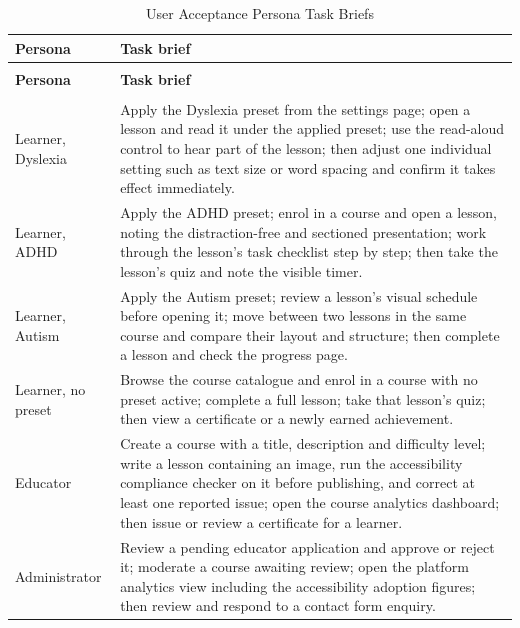 \documentclass[12pt, oneside]{article} %
\newcommand{\tabbreak}{\hyphenpenalty=200\exhyphenpenalty=200\tolerance=4000\hbadness=10000\hspace{0pt}}
\begin{document}
{
\renewcommand{\arraystretch}{1.2}
\footnotesize
\begin{longtable}{|>{\raggedright\arraybackslash\tabbreak}p{3.0cm}|>{\raggedright\arraybackslash\tabbreak}p{11.0cm}|}
\caption{User Acceptance Persona Task Briefs}
\label{tab:uat_personas}\\
\hline
\textbf{Persona} & \textbf{Task brief} \\
\hline \hline
\endfirsthead
\multicolumn{2}{l}{\footnotesize\itshape Table~\ref{tab:uat_personas} continued from the previous page}\\
\hline
\textbf{Persona} & \textbf{Task brief} \\
\hline \hline
\endhead
\hline
\multicolumn{2}{r}{\footnotesize\itshape continued on the next page}\\
\endfoot
\endlastfoot
Learner, Dyslexia & Apply the Dyslexia preset from the settings page; open a lesson and read it under the applied preset; use the read-aloud control to hear part of the lesson; then adjust one individual setting such as text size or word spacing and confirm it takes effect immediately. \\ \hline
Learner, ADHD & Apply the ADHD preset; enrol in a course and open a lesson, noting the distraction-free and sectioned presentation; work through the lesson's task checklist step by step; then take the lesson's quiz and note the visible timer. \\ \hline
Learner, Autism & Apply the Autism preset; review a lesson's visual schedule before opening it; move between two lessons in the same course and compare their layout and structure; then complete a lesson and check the progress page. \\ \hline
Learner, no preset & Browse the course catalogue and enrol in a course with no preset active; complete a full lesson; take that lesson's quiz; then view a certificate or a newly earned achievement. \\ \hline
Educator & Create a course with a title, description and difficulty level; write a lesson containing an image, run the accessibility compliance checker on it before publishing, and correct at least one reported issue; open the course analytics dashboard; then issue or review a certificate for a learner. \\ \hline
Administrator & Review a pending educator application and approve or reject it; moderate a course awaiting review; open the platform analytics view including the accessibility adoption figures; then review and respond to a contact form enquiry. \\ \hline
\end{longtable}
}
\end{document}
